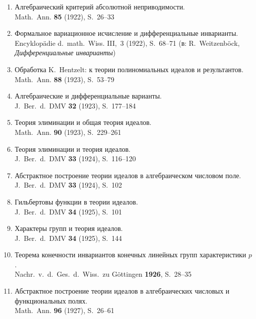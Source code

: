 \documentclass[11pt]{article}
\newcommand{\foreign}[1]{#1}
\begin{document}
\begin{enumerate}[label={\small\arabic*.},leftmargin=2em,itemsep=0.3em]
\item Алгебраический критерий абсолютной неприводимости.\\
\foreign{Math.\ Ann.} \textbf{85} (1922), S.~26--33

\item Формальное вариационное исчисление и дифференциальные инварианты.\\
\foreign{Encyklopädie d.\ math.\ Wiss.} III,\ 3 (1922), S.~68--71 (в:
R.\ Weitzenböck, \textit{Дифференциальные инварианты})

\item Обработка K.\ Hentzelt: к теории полиномиальных идеалов и результантов.\\
\foreign{Math.\ Ann.} \textbf{88} (1923), S.~53--79

\item Алгебраические и дифференциальные варианты.\\
\foreign{J.\ Ber.\ d.\ DMV} \textbf{32} (1923), S.~177--184

\item Теория элиминации и общая теория идеалов.\\
\foreign{Math.\ Ann.} \textbf{90} (1923), S.~229--261

\item Теория элиминации и теория идеалов.\\
\foreign{J.\ Ber.\ d.\ DMV} \textbf{33} (1924), S.~116--120

\item Абстрактное построение теории идеалов в алгебраическом числовом поле.\\
\foreign{J.\ Ber.\ d.\ DMV} \textbf{33} (1924), S.~102

\item Гильбертовы функции в теории идеалов.\\
\foreign{J.\ Ber.\ d.\ DMV} \textbf{34} (1925), S.~101

\item Характеры групп и теория идеалов.\\
\foreign{J.\ Ber.\ d.\ DMV} \textbf{34} (1925), S.~144

\item Теорема конечности инвариантов конечных линейных групп характеристики $p$.\\
\foreign{Nachr.\ v.\ d.\ Ges.\ d.\ Wiss.\ zu Göttingen} \textbf{1926}, S.~28--35

\item Абстрактное построение теории идеалов в алгебраических числовых и функциональных полях.\\
\foreign{Math.\ Ann.} \textbf{96} (1927), S.~26--61


\end{enumerate}
\end{document}
